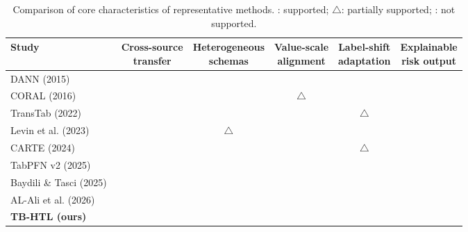 \documentclass[runningheads]{llncs}
\newcommand{\cmark}{\ding{51}}
\newcommand{\xmark}{\ding{55}}
\newcommand{\pmark}{$\triangle$}
\begin{document}
\begin{table}[t]
\centering
\caption{Comparison of core characteristics of representative methods. \cmark: supported; \pmark: partially supported; \xmark: not supported.}\label{tab:rw2}
\scriptsize
\setlength{\tabcolsep}{3.5pt}
\begin{tabular}{@{}lccccc@{}}
\toprule
Study & \makecell{Cross-source\\transfer} & \makecell{Heterogeneous\\schemas} & \makecell{Value-scale\\alignment} & \makecell{Label-shift\\adaptation} & \makecell{Explainable\\risk output} \\
\midrule
DANN (2015)~\cite{ganin2015} & \cmark & \xmark & \xmark & \xmark & \xmark \\
CORAL (2016)~\cite{sun2016} & \cmark & \xmark & \pmark & \xmark & \xmark \\
TransTab (2022)~\cite{wang2022} & \cmark & \cmark & \xmark & \pmark & \xmark \\
Levin et al. (2023)~\cite{levin2023} & \cmark & \pmark & \xmark & \cmark & \xmark \\
CARTE (2024)~\cite{kim2024} & \cmark & \cmark & \xmark & \pmark & \xmark \\
TabPFN v2 (2025)~\cite{hollmann2025} & \xmark & \xmark & \xmark & \xmark & \xmark \\
Baydili \& Tasci (2025)~\cite{baydili2025} & \xmark & \xmark & \xmark & \xmark & \cmark \\
AL-Ali et al. (2026)~\cite{alali2026} & \xmark & \xmark & \xmark & \xmark & \cmark \\
\midrule
\textbf{TB-HTL (ours)} & \cmark & \cmark & \cmark & \cmark & \cmark \\
\bottomrule
\end{tabular}
\end{table}
\end{document}
